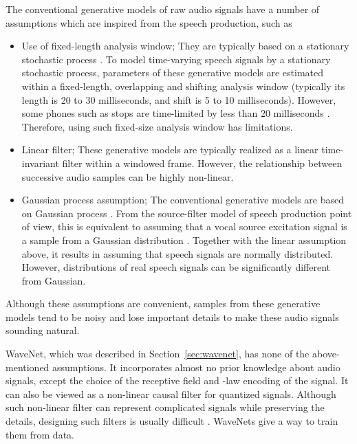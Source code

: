 \documentclass{article}
\begin{document}
The conventional generative models of raw audio signals have a number of assumptions which are inspired from the speech production, such as
\begin{itemize}
    \item Use of fixed-length analysis window; They are typically based on a stationary stochastic process \citep{LPC,UELS,Poritz_ARHMM_ICASSP82,Juang_MARHMM_ICASSP85,Kameoka_MultiKernelLPC_ASJ}.  To model time-varying speech signals by a stationary stochastic process, parameters of these generative models are estimated within a fixed-length, overlapping and shifting analysis window (typically its length is 20 to 30 milliseconds, and shift is 5 to 10 milliseconds).
    However, some phones such as stops are time-limited by less than 20 milliseconds \citep{Rabiner_ASR}.
    Therefore, using such fixed-size analysis window has limitations.
    \item Linear filter; These generative models are typically realized as a linear time-invariant filter  \citep{LPC,UELS,Poritz_ARHMM_ICASSP82,Juang_MARHMM_ICASSP85,Kameoka_MultiKernelLPC_ASJ} within a windowed frame.  However, the relationship between successive audio samples can be highly non-linear.
    \item Gaussian process assumption; The conventional generative models are based on Gaussian process \citep{LPC,UELS,Poritz_ARHMM_ICASSP82,Juang_MARHMM_ICASSP85,Kameoka_MultiKernelLPC_ASJ,Tokuda_CepLSTM_ICASSP2015,Tokuda_MixCepLSTM_ICASSP2016}.  From the source-filter model of speech production \citep{Chiba_SourceFilter,Fant_SourceFilter} point of view, this is equivalent to assuming that a vocal source excitation signal is a sample from a Gaussian distribution \citep{LPC,UELS,Poritz_ARHMM_ICASSP82,Juang_MARHMM_ICASSP85,Tokuda_CepLSTM_ICASSP2015,Kameoka_MultiKernelLPC_ASJ,Tokuda_MixCepLSTM_ICASSP2016}. 
    Together with the linear assumption above, it results in assuming that speech signals are normally distributed.
    However, distributions of real speech signals can be significantly different from Gaussian.
\end{itemize}
Although these assumptions are convenient, samples from these generative models tend to be noisy and lose important details to make these audio signals sounding natural.

WaveNet, which was described in Section~\ref{sec:wavenet}, has none of the above-mentioned assumptions.
It incorporates almost no prior knowledge about audio signals, except the choice of the receptive field and -law encoding of the signal.
It can also be viewed as a non-linear causal filter for quantized signals.
Although such non-linear filter can represent complicated signals while preserving the details, designing such filters is usually difficult \citep{NonlinearFilterDesign}.
WaveNets give a way to train them from data.
\end{document}
